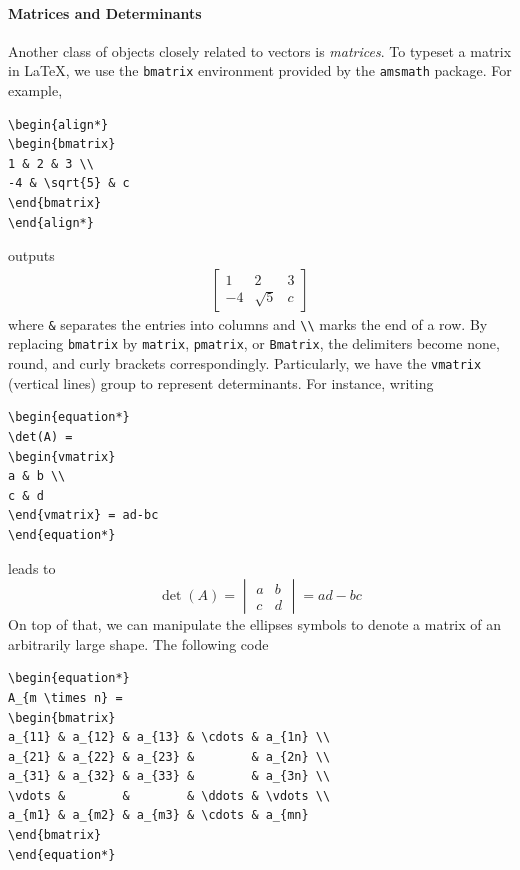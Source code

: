 \paragraph{Matrices and Determinants}
Another class of objects closely related to vectors is \textit{matrices}. To typeset a matrix in \LaTeX{}, we use the \texttt{bmatrix} environment provided by the \verb|amsmath| package. For example,
\begin{lstlisting}
\begin{align*}
\begin{bmatrix}
1 & 2 & 3 \\
-4 & \sqrt{5} & c
\end{bmatrix}
\end{align*}    
\end{lstlisting}
outputs
\begin{align*}
\begin{bmatrix}
1 & 2 & 3 \\
-4 & \sqrt{5} & c
\end{bmatrix}
\end{align*}
where \texttt{\&} separates the entries into columns and \texttt{\textbackslash\textbackslash} marks the end of a row. By replacing \texttt{bmatrix} by \texttt{matrix}, \texttt{pmatrix}, or \texttt{Bmatrix}, the delimiters become none, round, and curly brackets correspondingly. Particularly, we have the \texttt{vmatrix} (vertical lines) group to represent determinants. For instance, writing
\begin{lstlisting}
\begin{equation*}
\det(A) =
\begin{vmatrix}
a & b \\
c & d
\end{vmatrix} = ad-bc
\end{equation*}
\end{lstlisting}
leads to
\begin{equation*}
\det(A) = 
\begin{vmatrix}
a & b \\
c & d
\end{vmatrix} = ad-bc
\end{equation*}
On top of that, we can manipulate the ellipses symbols to denote a matrix of an arbitrarily large shape. The following code
\begin{lstlisting}
\begin{equation*}
A_{m \times n} = 
\begin{bmatrix}
a_{11} & a_{12} & a_{13} & \cdots & a_{1n} \\
a_{21} & a_{22} & a_{23} &        & a_{2n} \\
a_{31} & a_{32} & a_{33} &        & a_{3n} \\
\vdots &        &        & \ddots & \vdots \\
a_{m1} & a_{m2} & a_{m3} & \cdots & a_{mn}
\end{bmatrix}
\end{equation*}
\end{lstlisting}
